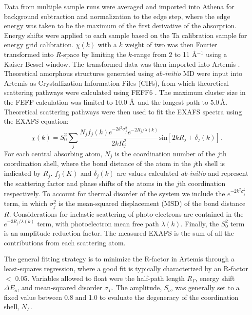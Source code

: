 Data from multiple sample runs were averaged and imported into Athena \cite{Ravel2005} for background subtraction and normalization to the edge step, where the edge energy was taken to be the maximum of the first derivative of the absorption. Energy shifts were applied to each sample based on the Ta calibration sample for energy grid calibration. $\chi(k)$ with a $k$ weight of two was then Fourier transformed into $R$-space by limiting the $k$-range from 2 to 11 \AA$^{-1}$ using a Kaiser-Bessel window.
The transformed data was then imported into Artemis \cite{Ravel2005}. Theoretical amorphous structures generated using \emph{ab-initio} MD were input into Artemis as Crystallization Information Files (CIFs), from which theoretical scattering pathways were calculated using FEFF6 \cite{Rehr2000}. The maximum cluster size in the FEFF calculation was limited to 10.0 \AA\, and the longest path to 5.0\,\AA. Theoretical scattering pathways were then used to fit the EXAFS spectra using the EXAFS equation:
\begin{equation}
\chi(k) = S^{2}_{0}\sum_{j}\frac{N_{j}f_{j}(k) e^{-2k^{2}\sigma_{j}^{2}} e^{-2R_{j}/\lambda(k)}}{2kR_{j}^{2}}\text{sin}[2kR_{j}+\delta_{j}(k)].
\label{eq:EXAFS}
\end{equation}
\noindent For each central absorbing atom, $N_{j}$ is the coordination number of the $j$th coordination shell, where the bond distance of the atom in the $j$th shell is indicated by $R_{j}$. $f_{j}(K)$ and $\delta_{j}(k)$ are values calculated \emph{ab-initio} and represent the scattering factor and phase shifts of the atoms in the $j$th coordination respectively. To account for thermal disorder of the system we include the $e^{-2k^{2}\sigma^{2}_{j}}$ term, in which $\sigma_{j}^{2}$ is the mean-squared displacement (MSD) of the bond distance $R$. Considerations for inelastic scattering of photo-electrons are contained in the $e^{-2R_{j}/\lambda(k)}$ term, with photoelectron mean free path $\lambda(k)$. Finally, the $S_{0}^{2}$ term is an amplitude reduction factor. The measured EXAFS is the sum of all the contributions from each scattering atom.

The general fitting strategy is to minimize the R-factor in Artemis through a least-squares regression, where a good fit is typically characterized by an R-factor $<$ 0.05. Variables allowed to float were the half-path length $R_{\Gamma}$, energy shift $\Delta E_{o}$, and mean-squared disorder $\sigma_{\Gamma}$. The amplitude, $S_{o}$, was generally set to a fixed value between 0.8 and 1.0 to evaluate the degeneracy of the coordination shell, $N_{\Gamma}$.

